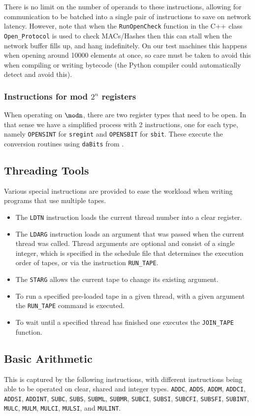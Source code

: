 There is no limit on the number of operands to these instructions,
allowing for communication to be batched into a single pair of
instructions to save on network latency. However, note that when
the \texttt{RunOpenCheck} function in the C++ class \texttt{Open\_Protocol}
is used to check MACs/Hashes then this can stall when the network buffer fills 
up, and hang indefinitely.
On our test machines this happens when opening around 10000 elements
at once, so care must be taken to avoid this when compiling or writing
bytecode (the Python compiler could automatically detect and avoid
this).

\subsubsection{Instructions for mod $2^n$ registers}
When operating on $\modn$, there are two register types that need to be open. In that sense we have a simplified process with 2 instructions, one for each type, namely \verb+OPENSINT+ for \verb+sregint+ and \verb+OPENSBIT+ for \verb|sbit|.
These execute the conversion routines using \verb+daBits+ from \cite{daBitPaper}.

\subsection{Threading Tools}
Various special instructions are provided to ease the workload when writing
programs that use multiple tapes. 
\begin{itemize}
\item The \verb+LDTN+ instruction loads the current thread number into 
a clear register.
\item The \verb+LDARG+ instruction loads an argument that was passed 
when the current thread was called.
Thread arguments are optional and consist of a single integer, 
which is specified in the schedule file that determines the execution 
order of tapes, or via the instruction \verb+RUN_TAPE+.
\item The \verb+STARG+ allows the current tape to change its
existing argument.
\item To run a specified pre-loaded tape in a given thread, with
a given argument the \verb+RUN_TAPE+ command is executed.
\item To wait until a specified thread has finished one executes
the \verb+JOIN_TAPE+ function.
\end{itemize}

\subsection{Basic Arithmetic}
This is captured by the following instructions,
with different instructions being able to be operated
on clear, shared and integer types.
    \verb+ADDC+,
    \verb+ADDS+,
    \verb+ADDM+,
    \verb+ADDCI+,
    \verb+ADDSI+,
    \verb+ADDINT+,
    \verb+SUBC+,
    \verb+SUBS+,
    \verb+SUBML+,
    \verb+SUBMR+,
    \verb+SUBCI+,
    \verb+SUBSI+,
    \verb+SUBCFI+,
    \verb+SUBSFI+,
    \verb+SUBINT+,
    \verb+MULC+,
    \verb+MULM+,
    \verb+MULCI+,
    \verb+MULSI+,
and
    \verb+MULINT+.

